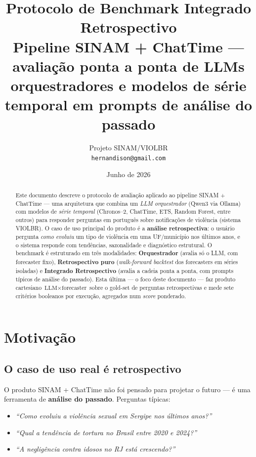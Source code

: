 \documentclass[11pt,a4paper]{article}
\title{\textbf{Protocolo de Benchmark Integrado Retrospectivo}\\
  \large Pipeline SINAM + ChatTime --- avaliação ponta a ponta de LLMs
  orquestradores e modelos de série temporal em prompts de análise do passado}
\author{Projeto SINAM/VIOLBR \\ \small \texttt{hernandison@gmail.com}}
\date{Junho de 2026}
\begin{document}
\maketitle

\begin{abstract}
Este documento descreve o protocolo de avaliação aplicado ao pipeline
SINAM + ChatTime --- uma arquitetura que combina um \emph{LLM orquestrador}
(Qwen3 via Ollama) com modelos de \emph{série temporal} (Chronos--2,
ChatTime, ETS, Random Forest, entre outros) para responder perguntas em
português sobre notificações de violência (sistema VIOLBR). O caso de uso
principal do produto é a \textbf{análise retrospectiva}: o usuário
pergunta \emph{como evoluiu} um tipo de violência em uma UF/município
nos últimos anos, e o sistema responde com tendências, sazonalidade e
diagnóstico estrutural. O benchmark é estruturado em três modalidades:
\textbf{Orquestrador} (avalia só o LLM, com forecaster fixo),
\textbf{Retrospectivo puro} (\emph{walk-forward backtest} dos forecasters
em séries isoladas) e \textbf{Integrado Retrospectivo} (avalia a cadeia
ponta a ponta, com prompts típicos de análise do passado). Esta última
--- o foco deste documento --- faz produto cartesiano
\(\text{LLM} \times \text{forecaster}\) sobre o gold-set de perguntas
retrospectivas e mede sete critérios booleanos por execução, agregados
num \emph{score} ponderado.
\end{abstract}

\tableofcontents
\vspace{1em}

\section{Motivação}

\subsection{O caso de uso real é retrospectivo}

O produto SINAM + ChatTime não foi pensado para projetar o futuro --- é
uma ferramenta de \textbf{análise do passado}. Perguntas típicas:

\begin{itemize}[leftmargin=*]
\item \emph{``Como evoluiu a violência sexual em Sergipe nos últimos anos?''}
\item \emph{``Qual a tendência de tortura no Brasil entre 2020 e 2024?''}
\item \emph{``A negligência contra idosos no RJ está crescendo?''}
\end{itemize}
\end{document}
